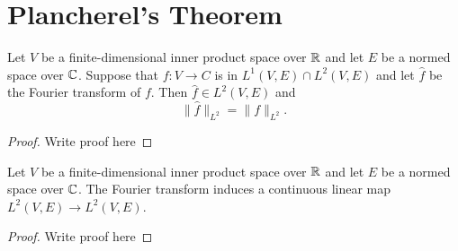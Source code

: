 \chapter{Plancherel's Theorem}
\label{chap:plancherel}


\begin{lemma}
  \label{lem:plancherel}
  \uses{}
  \leanok %
  Let $V$ be a finite-dimensional inner product space over $\mathbb{R}$ and let $E$ be a normed space over $\mathbb{C}$. Suppose that $f : V \to C$ is in $L^1(V,E)\cap L^2(V,E)$ and let $\widehat{f}$ be the Fourier transform of $f$. Then $\widehat{f}\in L^2(V,E)$ and
  \[\|\widehat{f}\|_{L^2} = \|f\|_{L^2}.\]
  \end{lemma}
    \begin{proof}
    Write proof here
\end{proof}

\begin{corollary}
  \label{lem:reparametrization}
  \leanok %
  Let $V$ be a finite-dimensional inner product space over $\mathbb{R}$ and let $E$ be a normed space over $\mathbb{C}$. The Fourier transform induces a continuous linear map $L^2(V,E) \to L^2(V,E)$.
  \end{corollary}
  \begin{proof}
    Write proof here
\end{proof}